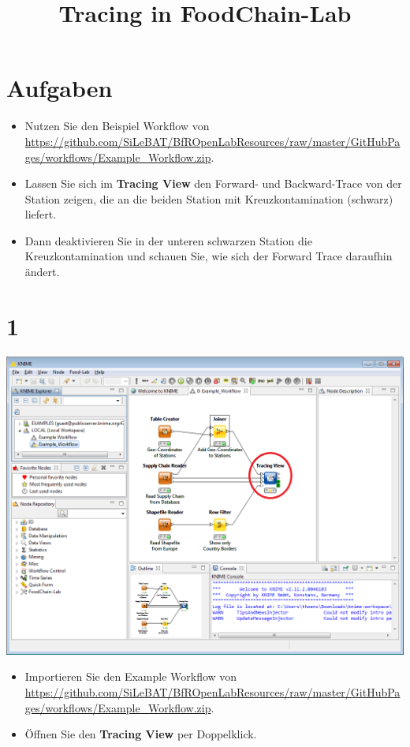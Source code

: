 \documentclass{beamer}
\title{Tracing in FoodChain-Lab}
\date{}
\begin{document}
\maketitle

\section{Aufgaben}
\begin{frame}
	\begin{itemize}
		\item Nutzen Sie den Beispiel Workflow von \url{https://github.com/SiLeBAT/BfROpenLabResources/raw/master/GitHubPages/workflows/Example_Workflow.zip}.
		\item Lassen Sie sich im \textbf{Tracing View} den Forward- und Backward-Trace von der Station zeigen, die an die beiden Station mit Kreuzkontamination (schwarz) liefert.
		\item Dann deaktivieren Sie in der unteren schwarzen Station die Kreuzkontamination und schauen Sie, wie sich der Forward Trace daraufhin ändert.
	\end{itemize}
\end{frame}
 
\section{1}
\begin{frame}
	\begin{center}
  		\includegraphics[height=0.6\textheight]{1.png}
	\end{center}
	\begin{itemize}
		\item Importieren Sie den Example Workflow von \url{https://github.com/SiLeBAT/BfROpenLabResources/raw/master/GitHubPages/workflows/Example_Workflow.zip}.
		\item Öffnen Sie den \textbf{Tracing View} per Doppelklick.
	\end{itemize}
\end{frame}
\end{document}
